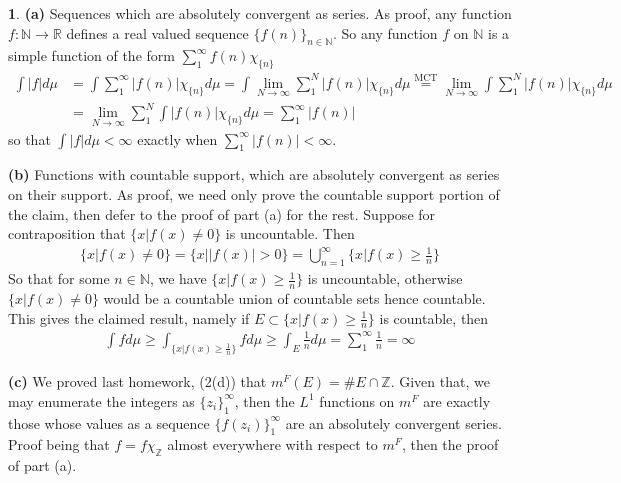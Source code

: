 \documentclass[10.5pt]{article}
\theoremstyle{definition}
\newtheorem{pb}{}
\newcommand{\set}[1]{\{#1\}}
\newcommand{\abs}[1]{\lvert#1\rvert}
\begin{document}
\begin{pb}
    \textbf{(a)} Sequences which are absolutely convergent as series. As proof, any function \(f: \mathbb{N} \to \mathbb{R}\) defines a real valued sequence \(\set{f(n)}_{n \in \mathbb{N}}\).
    So any function \(f\) on \(\mathbb{N}\) is a simple function of the form \(\sum_1^\infty f(n)\chi_{\set{n}}\)
    \begin{align*}
        \int \abs{f} d\mu &= \int \sum_1^\infty \abs{f(n)}\chi_{\set{n}} d\mu 
        = \int \lim_{N\to\infty}\sum_1^N \abs{f(n)}\chi_{\set{n}} d\mu \overset{\text{MCT}}{=} \lim_{N\to\infty}\int \sum_1^N \abs{f(n)}\chi_{\set{n}} d\mu \\ 
        &= \lim_{N\to\infty} \sum_1^N \int \abs{f(n)}\chi_{\set{n}} d\mu = \sum_1^\infty \abs{f(n)}
    \end{align*}
    so that \(\int \abs{f} d\mu < \infty\) exactly when \(\sum_1^\infty \abs{f(n)} < \infty\).

    \textbf{(b)} Functions with countable support, which are absolutely convergent as series on their support. As proof, we need only prove the countable support portion of the claim, then 
    defer to the proof of part (a) for the rest. Suppose for contraposition that \(\set{x \vert f(x) \neq 0}\) is uncountable. Then
    \begin{align*}
        \set{x \vert f(x) \neq 0} = \set{x \vert \abs{f(x)} > 0} = \bigcup_{n=1}^\infty \set{x \vert f(x) \geq \frac{1}{n}}
    \end{align*}
    So that for some \(n \in \mathbb{N}\), we have \(\set{x \vert f(x) \geq \frac{1}{n}}\) is uncountable, otherwise \(\set{x \vert f(x) \neq 0}\) would be a countable union of countable sets hence countable.
    This gives the claimed result, namely if \(E \subset \set{x \vert f(x) \geq \frac{1}{n}}\) is countable, then
    \begin{align*}
        \int f d\mu \geq \int_{\set{x \vert f(x) \geq \frac{1}{n}}} f d\mu \geq \int_E \frac{1}{n} d\mu = \sum_1^\infty \frac{1}{n} = \infty
    \end{align*}

    \textbf{(c)} We proved last homework, (2(d)) that \(m^F(E) = \# E \cap \mathbb{Z}\). Given that, we may enumerate the integers as \(\set{z_i}_1^\infty\), then
    the \(L^1\) functions on \(m^F\) are exactly those whose values as a sequence \(\set{f(z_i)}_1^\infty\) are an absolutely convergent series. Proof being that
    \(f = f\chi_\mathbb{Z}\) almost everywhere with respect to \(m^F\), then the proof of part (a).
\end{pb}
\end{document}
